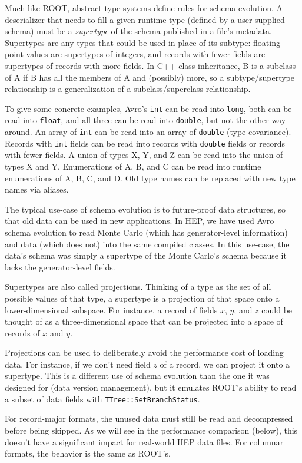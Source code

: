 \documentclass{article}
\begin{document}
Much like ROOT, abstract type systems define rules for schema evolution. A deserializer that needs to fill a given runtime type (defined by a user-supplied schema) must be a {\it supertype} of the schema published in a file's metadata. Supertypes are any types that could be used in place of its subtype: floating point values are supertypes of integers, and records with fewer fields are supertypes of records with more fields. In C++ class inheritance, B is a subclass of A if B has all the members of A and (possibly) more, so a subtype/supertype relationship is a generalization of a subclass/superclass relationship.

To give some concrete examples, Avro's {\tt int} can be read into {\tt long}, both can be read into {\tt float}, and all three can be read into {\tt double}, but not the other way around. An array of {\tt int} can be read into an array of {\tt double} (type covariance). Records with {\tt int} fields can be read into records with {\tt double} fields or records with fewer fields. A union of types X, Y, and Z can be read into the union of types X and Y. Enumerations of A, B, and C can be read into runtime enumerations of A, B, C, and D. Old type names can be replaced with new type names via aliases.

The typical use-case of schema evolution is to future-proof data structures, so that old data can be used in new applications. In HEP, we have used Avro schema evolution to read Monte Carlo (which has generator-level information) and data (which does not) into the same compiled classes. In this use-case, the data's schema was simply a supertype of the Monte Carlo's schema because it lacks the generator-level fields.

Supertypes are also called projections. Thinking of a type as the set of all possible values of that type, a supertype is a projection of that space onto a lower-dimensional subspace. For instance, a record of fields $x$, $y$, and $z$ could be thought of as a three-dimensional space that can be projected into a space of records of $x$ and $y$.

Projections can be used to deliberately avoid the performance cost of loading data. For instance, if we don't need field $z$ of a record, we can project it onto a supertype. This is a different use of schema evolution than the one it was designed for (data version management), but it emulates ROOT's ability to read a subset of data fields with {\tt TTree::SetBranchStatus}.

For record-major formats, the unused data must still be read and decompressed before being skipped. As we will see in the performance comparison (below), this doesn't have a significant impact for real-world HEP data files. For columnar formats, the behavior is the same as ROOT's.
\end{document}
